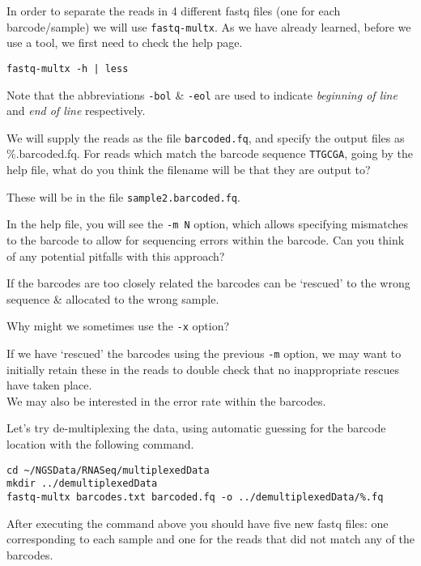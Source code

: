 \begin{steps}
In order to separate the reads in 4 different fastq files (one for each barcode/sample) we will use \texttt{fastq-multx}. 
As we have already learned, before we use a tool, we first need to check the help page.
\begin{lstlisting}
fastq-multx -h | less
\end{lstlisting}
Note that the abbreviations \texttt{-bol} \& \texttt{-eol} are used to indicate \textit{beginning of line} and \textit{end of line} respectively.
\end{steps}

\begin{questions}
We will supply the reads as the file \texttt{barcoded.fq}, and specify the output files as \%.barcoded.fq.
For reads which match the barcode sequence \texttt{TTGCGA}, going by the help file, what do you think the filename will be that they are output to? \\
\begin{answer}
These will be in the file \texttt{sample2.barcoded.fq}.\\
\end{answer}
In the help file, you will see the \texttt{-m N} option, which allows specifying mismatches to the barcode to allow for sequencing errors within the barcode.
Can you think of any potential pitfalls with this approach? \\
\begin{answer}
If the barcodes are too closely related the barcodes can be `rescued' to the wrong sequence \& allocated to the wrong sample. \\
\end{answer}
Why might we sometimes use the \texttt{-x} option? \\ 
\begin{answer}
If we have `rescued' the barcodes using the previous \texttt{-m} option, we may want to initially retain these in the reads to double check that no inappropriate rescues have taken place.\\
We may also be interested in the error rate within the barcodes.\\
\end{answer}
\end{questions}

\begin{steps}
Let's try de-multiplexing the data, using automatic guessing for the barcode location with the following command.\\
\begin{lstlisting}
cd ~/NGSData/RNASeq/multiplexedData
mkdir ../demultiplexedData
fastq-multx barcodes.txt barcoded.fq -o ../demultiplexedData/%.fq
\end{lstlisting}
After executing the command above you should have five new fastq files: one corresponding to each sample and one for the reads that did not match any of the barcodes.
\end{steps}

